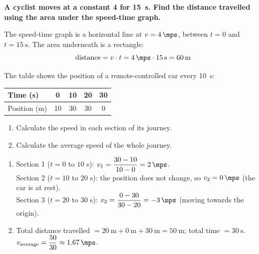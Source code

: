 \begin{example}
    \textbf{A cyclist moves at a constant \qty{4}{\mps} for \qty{15}{\s}. Find the distance travelled using the area under the speed-time graph.}

    The speed-time graph is a horizontal line at \(v = \qty{4}{\mps}\), between \(t=0\) and \(t=\qty{15}{\s}\). The area underneath is a rectangle:
    \begin{equation*}
        \text{distance} = v \cdot t = \qty{4}{\mps} \cdot \qty{15}{\s} = \qty{60}{\m}
    \end{equation*}
\end{example}

\begin{exercise}
    The table shows the position of a remote-controlled car every \qty{10}{\s}:
    \begin{center}
        \begin{tabular}{lcccc}
            \toprule
            Time (s) & 0 & 10 & 20 & 30 \\
            \midrule
            Position (m) & 10 & 30 & 30 & 0 \\
            \bottomrule
        \end{tabular}
    \end{center}
    \begin{enumerate}[label=\letraminuscula]
        \item Calculate the speed in each section of its journey.
        \item Calculate the average speed of the whole journey.
    \end{enumerate}
    \begin{solu}
        \begin{enumerate}[label=\alph*)]
            \item Section 1 (\(t=0\) to \(10\) s): \(v_1 = \dfrac{30-10}{10-0} = \qty{2}{\mps}\). \\
            Section 2 (\(t=10\) to \(20\) s): the position does not change, so \(v_2 = \qty{0}{\mps}\) (the car is at rest). \\
            Section 3 (\(t=20\) to \(30\) s): \(v_3 = \dfrac{0-30}{30-20} = \qty{-3}{\mps}\) (moving towards the origin).
            \item Total distance travelled \(= \qty{20}{\m} + \qty{0}{\m} + \qty{30}{\m} = \qty{50}{\m}\); total time \(= \qty{30}{\s}\). \\
            \(v_{\text{average}} = \dfrac{50}{30} \approx \qty{1.67}{\mps}\).
        \end{enumerate}
    \end{solu}
\end{exercise}

